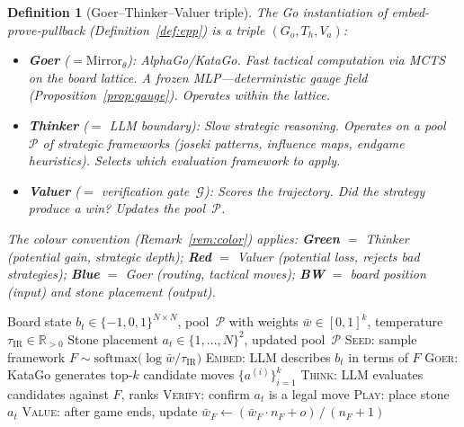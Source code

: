 \documentclass[11pt,a4paper]{article}
\newtheorem{definition}[theorem]{Definition}
\newcommand{\cG}{\mathcal{G}}
\newcommand{\cP}{\mathcal{P}}
\newcommand{\softmax}{\mathrm{softmax}}
\newcommand{\Embed}{\mathrm{Embed}}
\newcommand{\Mirror}{\mathrm{Mirror}}
\begin{document}
\begin{definition}[Goer--Thinker--Valuer triple]\label{def:gtv}
The Go instantiation of embed-prove-pullback
(Definition~\ref{def:epp}) is a triple $(G_o, T_h, V_a)$:
\begin{itemize}[nosep]
\item \textbf{Goer} ($= \Mirror_\theta$):
  AlphaGo/KataGo.
  Fast tactical computation via MCTS on the board lattice.
  A frozen MLP---deterministic gauge field
  (Proposition~\ref{prop:gauge}).
  Operates \emph{within} the lattice.
\item \textbf{Thinker} ($=$ LLM boundary):
  Slow strategic reasoning.
  Operates \emph{on} a pool~$\cP$ of strategic frameworks
  (joseki patterns, influence maps, endgame heuristics).
  Selects which evaluation framework to apply.
\item \textbf{Valuer} ($=$ verification gate~$\cG$):
  Scores the trajectory.
  Did the strategy produce a win?
  Updates the pool~$\cP$.
\end{itemize}
The colour convention (Remark~\ref{rem:color}) applies:
\textbf{Green} $=$ Thinker (potential gain, strategic depth);
\textbf{Red} $=$ Valuer (potential loss, rejects bad strategies);
\textbf{Blue} $=$ Goer (routing, tactical moves);
\textbf{BW} $=$ board position (input) and stone placement (output).
\end{definition}

\begin{algorithm}[ht]
\caption{MOPL --- Meta-Optimal Policy Learning
  \textup{[Online Projected Verification Descent]}}\label{alg:mopl}
\begin{algorithmic}[1]
\Require Board state $b_t \in \{-1,0,1\}^{N \times N}$,
  pool~$\cP$ with weights $\bar{w} \in [0,1]^k$,
  temperature $\tau_{\mathrm{IR}} \in \mathbb{R}_{>0}$
\Ensure Stone placement $a_t \in \{1,\ldots,N\}^2$,
  updated pool~$\cP$
\State \textsc{Seed}: sample framework $F \sim \softmax\!\bigl(\log \bar{w} / \tau_{\mathrm{IR}}\bigr)$
\State \textsc{Embed}: LLM describes $b_t$ in terms of $F$
  \Comment{$\Embed(b_t \mid F)$}
\State \textsc{Goer}: KataGo generates top-$k$ candidate moves $\{a^{(i)}\}_{i=1}^k$
  \Comment{$\Mirror_\theta(b_t)$}
\State \textsc{Think}: LLM evaluates candidates against $F$, ranks
\State \textsc{Verify}: confirm $a_t$ is a legal move
  \Comment{$\cG$ (legality check)}
\State \textsc{Play}: place stone $a_t$
\State \textsc{Value}: after game ends, update
  $\bar{w}_F \gets (\bar{w}_F \cdot n_F + o)\, / \,(n_F + 1)$
\end{algorithmic}
\end{algorithm}
\end{document}
